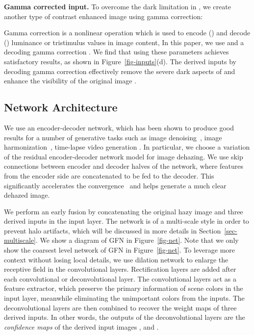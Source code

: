 \documentclass[10pt,twocolumn,letterpaper]{article}
\begin{document}
\vspace{-2mm}
{\flushleft \textbf{Gamma corrected input.}}
To overcome the dark limitation in , we create another type of
contrast enhanced image using gamma correction:

Gamma correction is a nonlinear operation which is used to encode () and decode () luminance or tristimulus values in image content,
In this paper, we use  and a decoding gamma correction .
We find that using these parameters achieves satisfactory
results, as shown in Figure~\ref{fig-inputs}(d).
The derived inputs by decoding gamma correction effectively
remove the severe dark aspects of  and
enhance the visibility of the original image .


\subsection{Network Architecture}
We use an encoder-decoder network, which has
been shown to produce good results for a number of generative tasks such as image denoising~\cite{mao2016image}, image harmonization~\cite{tsai2017deep}, time-lapse video generation \cite{wei2018learn}.
In particular, we choose a variation of the residual
encoder-decoder network model for image dehazing.
We use skip connections between encoder and decoder halves of the
network, where features from the encoder side are concatenated
to be fed to the decoder. This significantly accelerates the convergence~\cite{mao2016image} and helps generate a much clear dehazed image.


We perform an early fusion by concatenating the original hazy image and three derived inputs in the input layer.
The network is of a multi-scale style in order to prevent halo artifacts, which
will be discussed in more details in Section~\ref{sec-multiscale}.
We show a diagram of GFN in Figure~\ref{fig-net}. Note that we only show the coarsest level network of GFN in Figure~\ref{fig-net}.
To leverage more context without losing local details, we use dilation network to enlarge the receptive field in the convolutional layers.
Rectification layers are added after each convolutional or deconvolutional layer.
The convolutional layers act as a feature extractor, which preserve
the primary information of scene colors in the input layer,
meanwhile eliminating the unimportant colors from the inputs.
The deconvolutional layers are then combined to recover the weight maps of three derived inputs. In other words, the outputs of the deconvolutional layers are the \textit{confidence maps} of the derived input images ,  and .
\end{document}
